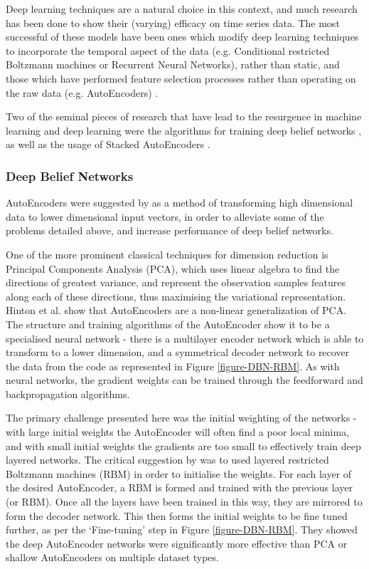 \documentclass[a4paper,11pt,oneside]{article}
\theoremstyle{plain}
\theoremstyle{definition}
\begin{document}
	Deep learning techniques are a natural choice in this context, and much research has been done to show their 
	(varying) efficacy on time series data. The most successful of these models have been ones which modify deep 
	learning techniques to incorporate the temporal aspect of the data (e.g. Conditional restricted Boltzmann 
	machines or Recurrent Neural Networks), rather than static, and those which have performed feature selection
	processes rather than operating on the raw data (e.g. AutoEncoders) \citep{Langkvist}. 
	\hfill \break 
	
	
	Two of the seminal pieces of research that have lead to the resurgence in machine learning and deep learning 
	were the algorithms for training deep belief networks \citep{Hinton1}, as well as the usage of Stacked AutoEncoders \citep{Ranzato1, Bengio1}. 
	
	
	\subsubsection{Deep Belief Networks}\label{DBN}
	
	AutoEncoders were suggested by \citet{Hinton2} as a method of transforming high dimensional 
	data to lower dimensional input vectors, in order to alleviate some of the problems detailed above, and increase 
	performance of deep belief networks.
	\hfill \break 
	
	One of the more prominent classical techniques for dimension reduction is Principal Components Analysis (PCA), 
	which uses linear algebra to find the directions of greatest variance, and represent the observation samples 
	features along each of these directions, thus maximising the variational representation. Hinton et al. show that 
	AutoEncoders are a non-linear generalization of PCA. The structure and training algorithms of the AutoEncoder 
	show it to be a specialised neural network - there is a multilayer encoder network which is able to transform to a 
	lower dimension, and a symmetrical decoder network to recover the data from the code as represented in Figure \ref{figure-DBN-RBM}. As with 
	neural networks, the gradient weights can be trained through the feedforward and backpropagation algorithms.  
	\hfill \break 
	
	The primary challenge presented here was the initial weighting of the networks - with large initial weights the 
	AutoEncoder will often find a poor local minima, and with small initial weights the gradients are too small to 
	effectively train deep layered networks. The critical suggestion by \citet{Hinton3} was to used layered restricted 
	Boltzmann machines (RBM) in order to initialise the weights. For each layer of the desired AutoEncoder, a RBM is 
	formed and trained with the previous layer (or RBM). Once all the layers have been 
	trained in this way, they are mirrored to form the decoder network. This then forms the initial weights to be fine 
	tuned further, as per the `Fine-tuning' step in Figure \ref{figure-DBN-RBM}. They showed the deep AutoEncoder networks were significantly more 
	effective than PCA or shallow AutoEncoders on multiple dataset types. 
	\hfill \break 
	
\end{document}
